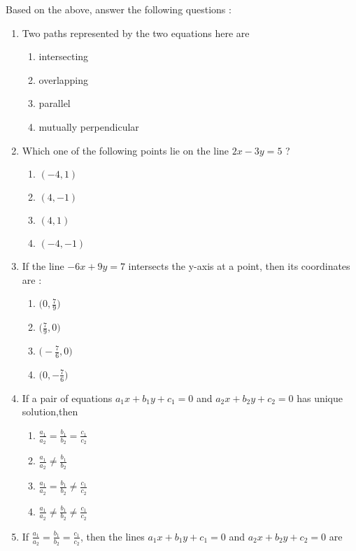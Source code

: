 \begin{enumerate}
Based on the above, answer the following questions :
 \begin{enumerate}[label=(\roman*)]
 \item Two paths represented by the two equations here are 
  \begin{enumerate}[label=(\Alph*)]
             \item intersecting
             \item overlapping
             \item parallel
             \item mutually perpendicular
    \end{enumerate}
\item Which one of the following points lie on the line $2x-3y=5$ ?
\begin{enumerate}[label=(\Alph*)]
             \item $\left( -4,1 \right)$
             \item $\left( 4,-1 \right)$
             \item $\left( 4,1 \right)$
             \item $\left( -4,-1 \right)$
    \end{enumerate}
\item If the line $-6x+9y=7$ intersects the y-axis at a point, then its coordinates are :
\begin{enumerate}[label=(\Alph*)]
             \item $\bigg(0,\frac{7}{9}\bigg)$
             \item $\bigg(\frac{7}{9},0\bigg)$
             \item $\bigg(-\frac{7}{6},0\bigg)$
             \item $\bigg(0,-\frac{7}{6}\bigg)$
\end{enumerate}
\item If a pair of equations $a_1x+b_1y+c_1=0$ and  $a_2x+b_2y+c_2=0$ has unique solution,then
\begin{enumerate}[label=(\Alph*)]
             \item $\frac{a_1}{a_2}=\frac{b_1}{b_2}=\frac{c_1}{c_2}$
             \item  $\frac{a_1}{a_2}\neq\frac{b_1}{b_2}$
             \item $\frac{a_1}{a_2}=\frac{b_1}{b_2}\neq\frac{c_1}{c_2}$
             \item $\frac{a_1}{a_2}\neq\frac{b_1}{b_2}\neq\frac{c_1}{c_2}$
\end{enumerate}
\item If $\frac{a_1}{a_2}=\frac{b_1}{b_2}=\frac{c_1}{c_2}$, then the lines $a_1x+b_1y+c_1=0$ and  $a_2x+b_2y+c_2=0$ are

\end{enumerate}
\end{enumerate}
